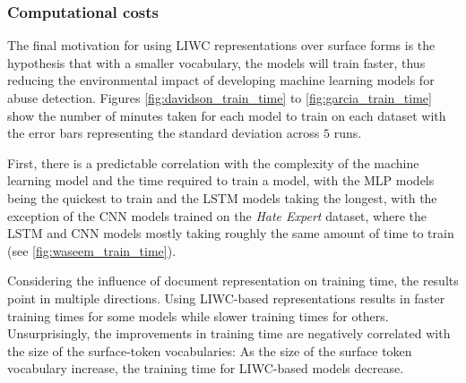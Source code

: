 \subsubsection{Computational costs}

The final motivation for using LIWC representations over surface forms is the hypothesis that with a smaller vocabulary, the models will train faster, thus reducing the environmental impact of developing machine learning models for abuse detection. Figures \ref{fig:davidson_train_time} to \ref{fig:garcia_train_time} show the number of minutes taken for each model to train on each dataset with the error bars representing the standard deviation across $5$ runs.

First, there is a predictable correlation with the complexity of the machine learning model and the time required to train a model, with the MLP models being the quickest to train and the LSTM models taking the longest, with the exception of the CNN models trained on the \textit{Hate Expert} dataset, where the LSTM and CNN models mostly taking roughly the same amount of time to train (see \cref{fig:waseem_train_time}).

Considering the influence of document representation on training time, the results point in multiple directions. Using LIWC-based representations results in faster training times for some models while slower training times for others. Unsurprisingly, the improvements in training time are negatively correlated with the size of the surface-token vocabularies: As the size of the surface token vocabulary increase, the training time for LIWC-based models decrease.

